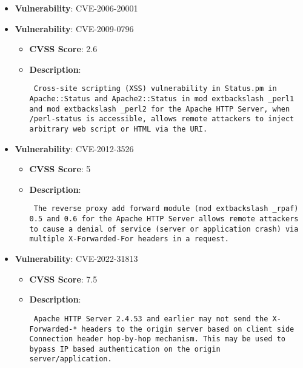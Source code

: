 \documentclass{article}
\begin{document}
\begin{itemize}
        \item \textbf{Vulnerability}: CVE-2006-20001
    
        \item \textbf{Vulnerability}: CVE-2009-0796
        \begin{itemize}
            \item \textbf{CVSS Score}:  2.6 
            \item \textbf{Description}: \parbox{\linewidth}{\texttt{ Cross-site scripting (XSS) vulnerability in Status.pm in Apache::Status and Apache2::Status in mod	extbackslash _perl1 and mod	extbackslash _perl2 for the Apache HTTP Server, when /perl-status is accessible, allows remote attackers to inject arbitrary web script or HTML via the URI. }}
        \end{itemize}
    
        \item \textbf{Vulnerability}: CVE-2012-3526
        \begin{itemize}
            \item \textbf{CVSS Score}:  5 
            \item \textbf{Description}: \parbox{\linewidth}{\texttt{ The reverse proxy add forward module (mod	extbackslash _rpaf) 0.5 and 0.6 for the Apache HTTP Server allows remote attackers to cause a denial of service (server or application crash) via multiple X-Forwarded-For headers in a request. }}
        \end{itemize}
    
        \item \textbf{Vulnerability}: CVE-2022-31813
        \begin{itemize}
            \item \textbf{CVSS Score}:  7.5 
            \item \textbf{Description}: \parbox{\linewidth}{\texttt{ Apache HTTP Server 2.4.53 and earlier may not send the X-Forwarded-* headers to the origin server based on client side Connection header hop-by-hop mechanism. This may be used to bypass IP based authentication on the origin server/application. }}
        \end{itemize}
    

\end{itemize}
\end{document}
